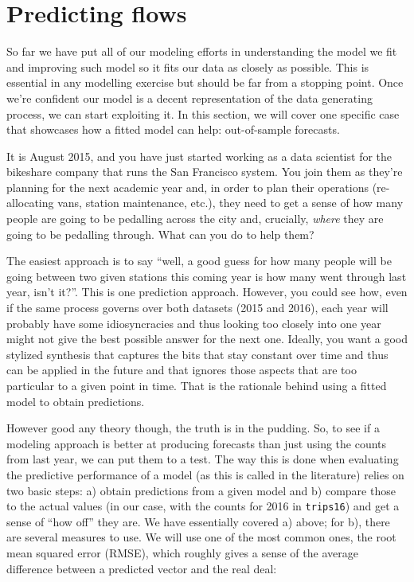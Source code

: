 \documentclass[
  letterpaper,
  krantz2]{style/krantz}
\begin{document}
\hypertarget{predicting-flows}{%
\section{Predicting flows}\label{predicting-flows}}

So far we have put all of our modeling efforts in understanding the
model we fit and improving such model so it fits our data as closely as
possible. This is essential in any modelling exercise but should be far
from a stopping point. Once we're confident our model is a decent
representation of the data generating process, we can start exploiting
it. In this section, we will cover one specific case that showcases how
a fitted model can help: out-of-sample forecasts.

It is August 2015, and you have just started working as a data scientist
for the bikeshare company that runs the San Francisco system. You join
them as they're planning for the next academic year and, in order to
plan their operations (re-allocating vans, station maintenance, etc.),
they need to get a sense of how many people are going to be pedalling
across the city and, crucially, \emph{where} they are going to be
pedalling through. What can you do to help them?

The easiest approach is to say ``well, a good guess for how many people
will be going between two given stations this coming year is how many
went through last year, isn't it?''. This is one prediction approach.
However, you could see how, even if the same process governs over both
datasets (2015 and 2016), each year will probably have some
idiosyncracies and thus looking too closely into one year might not give
the best possible answer for the next one. Ideally, you want a good
stylized synthesis that captures the bits that stay constant over time
and thus can be applied in the future and that ignores those aspects
that are too particular to a given point in time. That is the rationale
behind using a fitted model to obtain predictions.

However good any theory though, the truth is in the pudding. So, to see
if a modeling approach is better at producing forecasts than just using
the counts from last year, we can put them to a test. The way this is
done when evaluating the predictive performance of a model (as this is
called in the literature) relies on two basic steps: a) obtain
predictions from a given model and b) compare those to the actual values
(in our case, with the counts for 2016 in \texttt{trips16}) and get a
sense of ``how off'' they are. We have essentially covered a) above; for
b), there are several measures to use. We will use one of the most
common ones, the root mean squared error (RMSE), which roughly gives a
sense of the average difference between a predicted vector and the real
deal:
\end{document}
